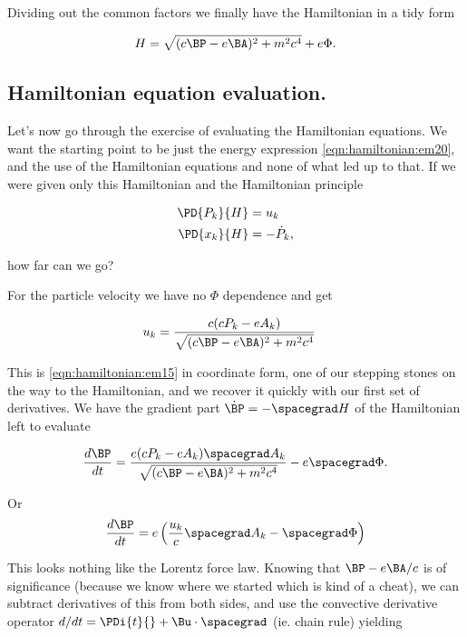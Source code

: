 Dividing out the common factors we finally have the Hamiltonian in a tidy form

\begin{align}\label{eqn:hamiltonian:em20}
H = \sqrt{ (c \BP - e \BA)^2 + m^2 c^4 } + e\Phi.
\end{align}

\subsection{Hamiltonian equation evaluation.}

Let's now go through the exercise of evaluating the Hamiltonian equations.  We want the starting point to be just the energy expression \ref{eqn:hamiltonian:em20}, and the use of the Hamiltonian equations and none of what led up to that.  If we were given only this Hamiltonian and the Hamiltonian principle

\begin{subequations}
\begin{align}\label{eqn:hamiltonian:em21}
\PD{P_k}{H} &= u_k \\
\PD{x_k}{H} &= -\dot{P}_k,
\end{align}
\end{subequations}

how far can we go?

For the particle velocity we have no $\Phi$ dependence and get

\begin{align}\label{eqn:hamiltonian:em22}
u_k &= \frac{c (c P_k -e A_k)}{\sqrt{ (c \BP - e \BA)^2 + m^2 c^4 }}
\end{align}

This is \ref{eqn:hamiltonian:em15} in coordinate form, one of our stepping stones on the way to the Hamiltonian, and we recover it quickly with our first set of derivatives.  We have the gradient part $\dot{\BP} = -\spacegrad H$ of the Hamiltonian left to evaluate 

\begin{align}\label{eqn:hamiltonian:em23}
\frac{d\BP}{dt} = 
\frac{e (c P_k -e A_k) \spacegrad A_k }{\sqrt{ (c \BP - e \BA)^2 + m^2 c^4 }} - e \spacegrad \Phi.
\end{align}

Or
\begin{align}\label{eqn:hamiltonian:em23b}
\frac{d\BP}{dt} = e \left( \frac{u_k}{c} \spacegrad A_k - \spacegrad \Phi \right)
\end{align}

This looks nothing like the Lorentz force law.  Knowing that $\BP - e\BA/c$ is of significance (because we know where we started which is kind of a cheat), we can subtract derivatives of this from both sides, and use the convective derivative operator $d/dt = \PDi{t}{} + \Bu \cdot \spacegrad$ (ie. chain rule) yielding

